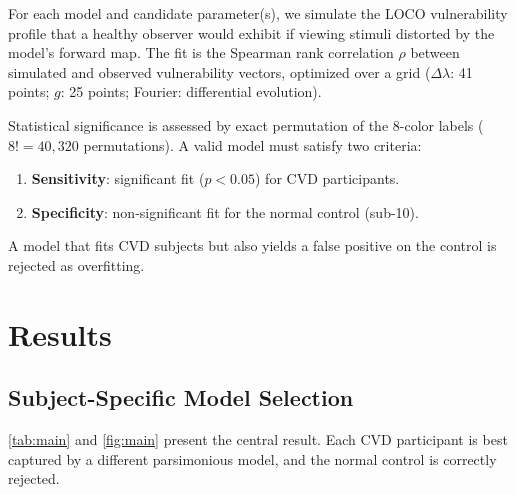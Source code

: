 \documentclass{article}
\begin{document}
For each model and candidate parameter(s), we simulate the LOCO vulnerability profile that a healthy observer would exhibit if viewing stimuli distorted by the model's forward map.
The fit is the Spearman rank correlation $\rho$ between simulated and observed vulnerability vectors, optimized over a grid ($\Delta\lambda$: 41 points; $g$: 25 points; Fourier: differential evolution).

Statistical significance is assessed by exact permutation of the 8-color labels ($8! = 40{,}320$ permutations).
A valid model must satisfy two criteria:
\begin{enumerate}
    \item \textbf{Sensitivity}: significant fit ($p < 0.05$) for CVD participants.
    \item \textbf{Specificity}: non-significant fit for the normal control (sub-10).
\end{enumerate}
A model that fits CVD subjects but also yields a false positive on the control is rejected as overfitting.

\section{Results}
\label{sec:results}

\subsection{Subject-Specific Model Selection}

\cref{tab:main} and \cref{fig:main} present the central result.
Each CVD participant is best captured by a different parsimonious model, and the normal control is correctly rejected.
\end{document}
